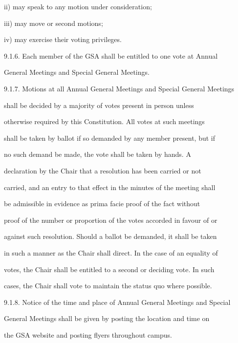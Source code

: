 ii)     may speak to any motion under consideration;  



iii)    may move or second motions;  



iv)     may exercise their voting privileges.  



9.1.6. Each  member  of  the  GSA  shall  be  entitled  to  one  vote  at  Annual  

        General Meetings and Special General Meetings.  



9.1.7. Motions at all Annual General Meetings and Special General Meetings  

        shall  be  decided  by  a  majority  of  votes  present  in  person  unless  

        otherwise  required  by  this  Constitution.  All  votes  at  such  meetings  

        shall be taken by ballot if so demanded by any member present, but if  

        no  such  demand  be  made,  the  vote  shall  be  taken  by  hands.  A  

        declaration  by  the  Chair  that  a  resolution  has  been  carried  or  not  

        carried, and an entry to that effect in the minutes of the meeting shall  

        be  admissible  in  evidence  as  prima  facie  proof  of  the  fact  without  

        proof of the number or proportion of the votes accorded in favour of or  

        against such resolution. Should a ballot be demanded, it shall be taken  

        in such a manner as the Chair shall direct. In the case of an equality of  

        votes, the Chair shall be entitled to a second or deciding vote. In such  

        cases, the Chair shall vote to maintain the status quo where possible.  



9.1.8. Notice of the time and place of Annual General Meetings and Special  

        General Meetings shall be given by posting the location and time on  

        the GSA website and posting flyers throughout campus.  



